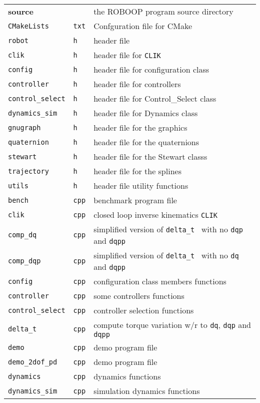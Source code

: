 \documentclass[11pt,fleqn,letterpaper]{report}
\begin{document}
{\begin{tabular}{lll}
{\bf source} & & the \textsf{ROBOOP} program source directory \\
{\tt CMakeLists} & {\tt txt} & Confguration file for CMake \\
{\tt robot} & {\tt h} & header file \\
{\tt clik} & {\tt h} & header file for {\tt CLIK} \\
{\tt config} & {\tt h} & header file for configuration class\\
{\tt controller} & {\tt h} & header file for controllers\\
{\tt control\_select} & {\tt h} & header file for Control\_Select class\\
{\tt dynamics\_sim} & {\tt h} & header file for Dynamics class\\
{\tt gnugraph} & {\tt h} & header file for the graphics \\
{\tt quaternion} & {\tt h} & header file for the quaternions \\
{\tt stewart} & {\tt h} & header file for the Stewart classs \\
{\tt trajectory} & {\tt h} & header file for the splines \\
{\tt utils} & {\tt h} & header file utility functions \\
{\tt bench   } & {\tt cpp} & benchmark program file \\
{\tt clik   } & {\tt cpp} & closed loop inverse kinematics {\tt CLIK} \\
{\tt comp\_dq } & {\tt cpp} & simplified version of {\tt delta\_t } with no {\tt dqp} and {\tt dqpp} \\
{\tt comp\_dqp} & {\tt cpp} & simplified version of {\tt delta\_t } with no {\tt dq} and {\tt dqpp} \\
{\tt config    } & {\tt cpp} & configuration class members functions \\
{\tt controller} & {\tt cpp} & some controllers functions\\
{\tt control\_select} & {\tt cpp} & controller selection functions\\
{\tt delta\_t } & {\tt cpp} & compute torque variation w/r to {\tt dq}, {\tt dqp} and {\tt dqpp} \\
{\tt demo    } & {\tt cpp} & demo program file \\
{\tt demo\_2dof\_pd} & {\tt cpp} & demo program file \\
{\tt dynamics} & {\tt cpp} & dynamics functions  \\
{\tt dynamics\_sim} & {\tt cpp} & simulation dynamics functions\\

\end{tabular}}
\end{document}
